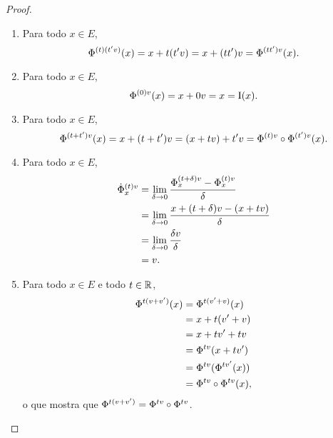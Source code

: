 \begin{proof}
	\begin{enumerate}
	\item Para todo $x \in E$,
		\begin{equation*}
		\fluxo{(t)}{(t'v)}(x) = x + t(t'v) = x + (tt')v = \fluxo{(tt')}{v}(x).
		\end{equation*}

	\item Para todo $x \in E$,
		\begin{equation*}
		\fluxo{(0)}{v}(x) = x + 0v = x = \Id(x).
		\end{equation*}

	\item Para todo $x \in E$,
		\begin{equation*}
		\fluxo{(t+t')}{v}(x) = x + (t + t')v = (x + tv) + t'v = \fluxo{(t)}{v} \circ \fluxo{(t')}{v}(x).
		\end{equation*}

	\item Para todo $x \in E$,
		\begin{align*}
		\fluxo[\dot]{(t)}{v}_{x} &= \lim_{\delta \to 0} \frac{\fluxo{(t+\delta)}{v}_{x} - \fluxo{(t)}{v}_{x}}{\delta} \\
			&= \lim_{\delta \to 0} \frac{x + (t + \delta)v - (x + tv)}{\delta} \\
			&= \lim_{\delta \to 0} \frac{\delta v}{\delta} \\
			&= v.
		\end{align*}

	\item Para todo $x \in E$ e todo $t \in \R$,
		\begin{align*}
		\fluxo{t}{(v+v')}(x) &= \fluxo{t}{(v'+v)}(x) \\
			&= x + t(v'+v) \\
			&= x + tv' + tv \\
			&= \fluxo{t}{v}(x+tv') \\
			&= \fluxo{t}{v}(\fluxo{t}{v'}(x)) \\
			&= \fluxo{t}{v} \circ \fluxo{t}{v} (x),
		\end{align*}
	o que mostra que $\fluxo{t}{(v+v')} = \fluxo{t}{v} \circ \fluxo{t}{v}$.
	\qedhere
	\end{enumerate}
\end{proof}


